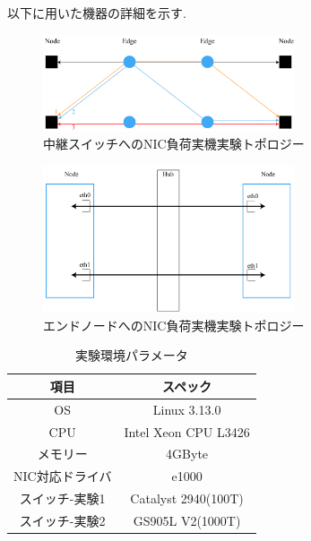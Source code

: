 \documentclass[11pt, a4paper, twocolumn]{jsarticle}
\begin{document}
以下に用いた機器の詳細を示す.
\begin{figure}[t]
    \begin{center}
    \includegraphics[autoebb, width=210pt]{./img/topology_ns3.pdf}
    \caption{中継スイッチへのNIC負荷実機実験トポロジー}
    \label{fig:topology_switch}
    \end{center}
\end{figure}

\begin{figure}[t]
    \begin{center}
    \includegraphics[autoebb, width=210pt]{./img/topology_real.pdf}
    \caption{エンドノードへのNIC負荷実機実験トポロジー}
    \label{fig:topology_node}
    \end{center}
\end{figure}

\begin{table}[h]
\begin{center}
\footnotesize
\begin{tabular}{c|c}
\hline
項目 & スペック \\ \hline \hline
OS & Linux 3.13.0 \\
CPU & Intel Xeon CPU L3426 \\
メモリー & 4GByte \\
NIC対応ドライバ & e1000 \\
スイッチ-実験1 & Catalyst 2940(100T) \\
スイッチ-実験2 & GS905L V2(1000T) \\
\hline
\end{tabular}
\caption{実験環境パラメータ}
\label{table:experiment_ver}
\end{center}
\end{table}
\end{document}
